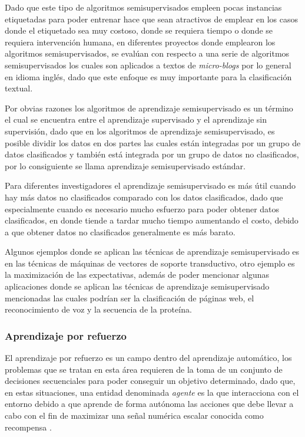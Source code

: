Dado que este tipo de algoritmos semisupervisados empleen pocas instancias etiquetadas para poder entrenar hace que sean atractivos de emplear en los casos donde el etiquetado sea muy costoso, donde se requiera tiempo o donde se requiera intervención humana, en diferentes proyectos donde emplearon los algoritmos semisupervisados, se evalúan con respecto a una serie de algoritmos semisupervisados los cuales son aplicados a textos de \textit{micro-blogs} por lo general en idioma inglés, dado que este enfoque es muy importante para la clasificación textual.

Por obvias razones los algoritmos de aprendizaje semisupervisado es un término el cual se encuentra entre el aprendizaje supervisado y el aprendizaje sin supervisión, dado que en los algoritmos de aprendizaje semisupervisado, es posible dividir los datos en dos partes las cuales están integradas por un grupo de datos clasificados y también está integrada por un grupo de datos no clasificados, por lo consiguiente se llama aprendizaje semisupervisado estándar.

Para diferentes investigadores el aprendizaje semisupervisado es más útil cuando hay más datos no clasificados comparado con los datos clasificados, dado que especialmente cuando es necesario mucho esfuerzo para poder obtener datos clasificados, en donde tiende a tardar mucho tiempo aumentando el costo, debido a que obtener datos no clasificados generalmente es más barato.

Algunos ejemplos donde se aplican las técnicas de aprendizaje semisupervisado es en las técnicas de máquinas de vectores de soporte transductivo, otro ejemplo es la maximización de las expectativas, además de poder mencionar algunas aplicaciones donde se aplican las técnicas de aprendizaje semisupervisado mencionadas las cuales podrían ser la clasificación de páginas web, el reconocimiento de voz y la secuencia de la proteína.


\subsubsection{Aprendizaje por refuerzo}

El aprendizaje por refuerzo es un campo dentro del aprendizaje automático, los problemas que se tratan en esta área requieren de la toma de un conjunto de decisiones secuenciales para poder conseguir un objetivo determinado, dado que, en estas situaciones, una entidad denominada \textit{agente} es la que interacciona con el entorno debido a que aprende de forma autónoma las acciones que debe llevar a cabo con el fin de maximizar una señal numérica escalar conocida como recompensa \cite{GuerraRamos2020}.

